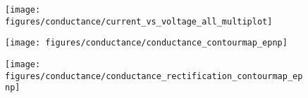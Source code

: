 \begin{figure*}[htbp]
  \centering
  \begin{subfigure}[t]{4.5cm}
    \centering
    \caption{}\vspace{-3mm}\label{fig:current-voltage_curves}
    \texttt{[image: figures/conductance/current\_vs\_voltage\_all\_multiplot]}
  \end{subfigure}
  \begin{minipage}[t]{8cm}
    \begin{subfigure}[t]{8cm}
      \centering
      \caption{}\vspace{-5mm}\label{fig:conductance_contourmap_epnp}
      \texttt{[image: figures/conductance/conductance\_contourmap\_epnp]}
    \end{subfigure}
    \begin{subfigure}[t]{8cm}
      \centering
      \caption{}\vspace{-5mm}\label{fig:conductance_rectification_contourmap_epnp}
      \texttt{[image: figures/conductance/conductance\_rectification\_contourmap\_epnp]}
    \end{subfigure} 
  \end{minipage}


\end{figure*}

